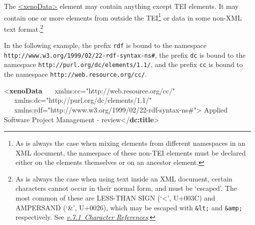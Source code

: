 \par
The \hyperref[TEI.xenoData]{<xenoData>} element may contain anything except TEI elements. It may contain one or more elements from outside the TEI\footnote{As is always the case when mixing elements from different namespaces in an XML document, the namespace of these non-TEI elements must be declared either on the elements themselves or on an ancestor element.} or data in some non-XML text format.\footnote{As is always the case when using text inside an XML document, certain characters cannot occur in their normal form, and must be ‘escaped’. The most common of these are LESS-THAN SIGN (‘<’, U+003C) and AMPERSAND (‘\&’, U+0026), which may be escaped with \texttt{\&lt;} and \texttt{\&amp;} respectively. See \textit{\hyperref[SG-er]{v.7.1\ Character References}}.}\par
In the following example, the prefix \texttt{rdf} is bound to the namespace \texttt{http://www.w3.org/1999/02/22-rdf-syntax-ns\#}, the prefix \texttt{dc} is bound to the namespace \texttt{http://purl.org/dc/elements/1.1/}, and the prefix \texttt{cc} is bound to the namespace \texttt{http://web.resource.org/cc/}. \par\bgroup{}\exampleFont \begin{shaded}\noindent\mbox{}{<\textbf{xenoData}\mbox{}\newline 
   xmlns:cc="http://web.resource.org/cc/"\mbox{}\newline 
   xmlns:dc="http://purl.org/dc/elements/1.1/"\mbox{}\newline 
   xmlns:rdf="http://www.w3.org/1999/02/22-rdf-syntax-ns\#">}\mbox{}\newline 
{}\mbox{}\newline 
\hspace*{1em}\mbox{}\newline 
\hspace*{1em}\hspace*{1em}Applied Software Project Management - review{</\textbf{dc:title}>}\mbox{}\newline 
\hspace*{1em}\hspace*{1em}\mbox{}\newline 

\end{shaded}
